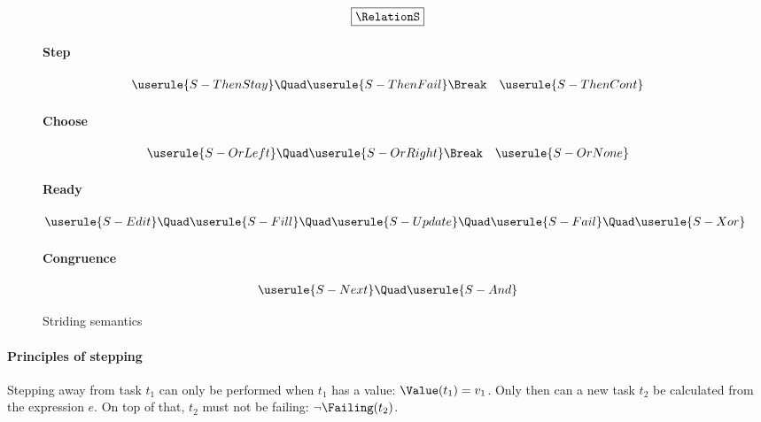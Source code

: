 \begin{figure}[h]
  \small

  \begin{gather*}
    \boxed{\RelationS}
  \end{gather*}

  \paragraph{Step}
  \begin{align*}
    \userule{S-ThenStay} \Quad
    & \userule{S-ThenFail} \Break
    & \userule{S-ThenCont}
  \end{align*}

  \paragraph{Choose}
  \begin{align*}
    \userule{S-OrLeft} \Quad
    & \userule{S-OrRight} \Break
    & \userule{S-OrNone}
  \end{align*}

  \paragraph{Ready}
  \begin{gather*}
    \userule{S-Edit} \Quad \userule{S-Fill} \Quad \userule{S-Update} \Quad
    \userule{S-Fail} \Quad \userule{S-Xor}
  \end{gather*}

  \paragraph{Congruence}
  \begin{gather*}
    \userule{S-Next} \Quad
    \userule{S-And}
  \end{gather*}

  \caption{Striding semantics} \label{fig:striding-semantics}
\end{figure}



\paragraph{Principles of stepping}
\label{sub:stepping-principles}

Stepping away from task $t_1$ can only be performed when
$t_1$ has a value: $\Value(t_1) = v_1$.
Only then can a new task $t_2$ be calculated from the expression $e$.
On top of that, $t_2$ must not be failing: $\neg\Failing(t_2)$.

